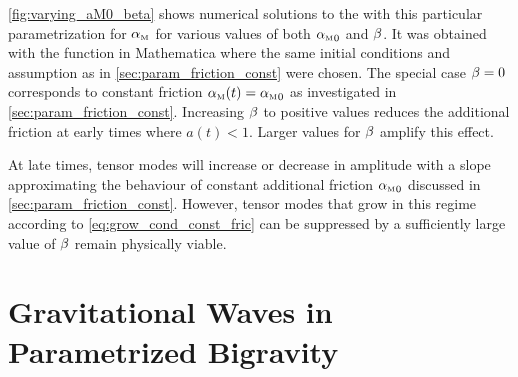 \documentclass[12pt,parskip=half]{scrreprt}
\begin{document}
\autoref{fig:varying_aM0_beta} shows numerical solutions to the  with this particular parametrization for \({\alpha_{\textnormal{\tiny{M}}}}\) for various values of both \({\alpha_{\textnormal{\tiny{M}}}}_0\) and \(\beta\). It was obtained with the  function in Mathematica where the same initial conditions and assumption as in \autoref{sec:param_friction_const} were chosen. The special case \(\beta=0\) corresponds to constant friction \({\alpha_{\textnormal{\tiny{M}}}}(t)={\alpha_{\textnormal{\tiny{M}}}}_0\) as investigated in \autoref{sec:param_friction_const}. Increasing \(\beta\) to positive values reduces the additional friction at early times where \(a(t) < 1\). Larger values for \(\beta\) amplify this effect. 


At late times, tensor modes will increase or decrease in amplitude with a slope approximating the behaviour of constant additional friction \({\alpha_{\textnormal{\tiny{M}}}}_0\) discussed in \autoref{sec:param_friction_const}. However, tensor modes that grow in this regime according to \eqref{eq:grow_cond_const_fric} can be suppressed by a sufficiently large value of \(\beta\) remain physically viable. 


\chapter{Gravitational Waves in Parametrized Bigravity}\label{ch:param_bigravity}
\end{document}
